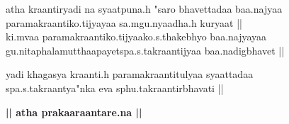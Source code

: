 {\hindifont\selectfont
\OnehalfSpacing
\large
{}%
atha kraantiryadi na syaatpuna.h "saro bhavettadaa baa.najyaa \\ paramakraantiko.tijyayaa sa.mgu.nyaadha.h kuryaat || \\
ki.mvaa paramakraantiko.tijyaako.s.thakebhyo baa.najyayaa \\ gu.nitaphalamutthaapayetspa.s.takraantijyaa baa.nadigbhavet || 
\medskip

%
yadi khagasya kraanti.h paramakraantitulyaa syaattadaa\\ spa.s.takraantya"nka eva sphu.takraantirbhavati || 
\bigskip

{\bfseries || atha prakaaraantare.na ||}
\bigskip

}
